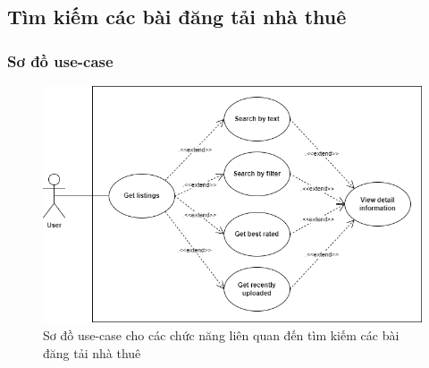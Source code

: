 \subsection{Tìm kiếm các bài đăng tải nhà thuê}
\subsubsection{Sơ đồ use-case}
\begin{figure}[H]
    \centering
    \includegraphics[width=1\textwidth]{Images/UseCase/GetListing.png}
    \caption{Sơ đồ use-case cho các chức năng liên quan đến tìm kiếm các bài đăng tải nhà thuê}
\end{figure}
